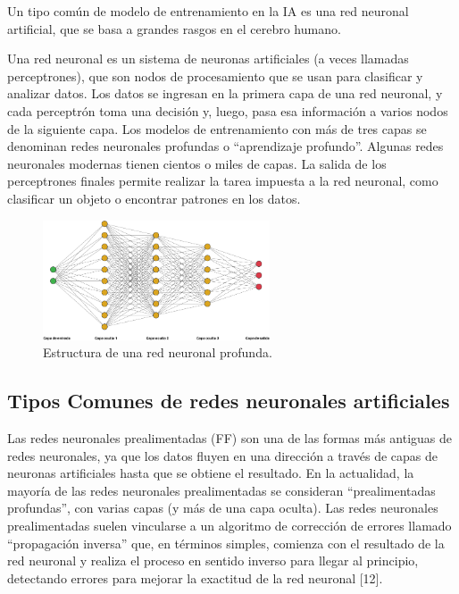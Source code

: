 Un tipo común de modelo de entrenamiento en la IA es una red neuronal artificial, que se basa a grandes rasgos en el cerebro humano.

Una red neuronal es un sistema de neuronas artificiales (a veces llamadas perceptrones), que son nodos de procesamiento que se usan para clasificar y analizar datos. Los datos se ingresan en la primera capa de una red neuronal, y cada perceptrón toma una decisión y, luego, pasa esa información a varios nodos de la siguiente capa. Los modelos de entrenamiento con más de tres capas se denominan redes neuronales profundas o “aprendizaje profundo”. Algunas redes neuronales modernas tienen cientos o miles de capas. La salida de los perceptrones finales permite realizar la tarea impuesta a la red neuronal, como clasificar un objeto o encontrar patrones en los datos.

\begin{figure}[H]
  \centering
  \includegraphics[width=0.6\textwidth]{imagenes_doc/redes_neuronales.png}
  \caption{Estructura de una red neuronal profunda.}
  \label{fig:logo}
\end{figure}



\subsection{Tipos Comunes de redes neuronales artificiales}

Las redes neuronales prealimentadas (FF) son una de las formas más antiguas de redes neuronales, ya que los datos fluyen en una dirección a través de capas de neuronas artificiales hasta que se obtiene el resultado. En la actualidad, la mayoría de las redes neuronales prealimentadas se consideran “prealimentadas profundas”, con varias capas (y más de una capa oculta). Las redes neuronales prealimentadas suelen vincularse a un algoritmo de corrección de errores llamado “propagación inversa” que, en términos simples, comienza con el resultado de la red neuronal y realiza el proceso en sentido inverso para llegar al principio, detectando errores para mejorar la exactitud de la red neuronal [12].


